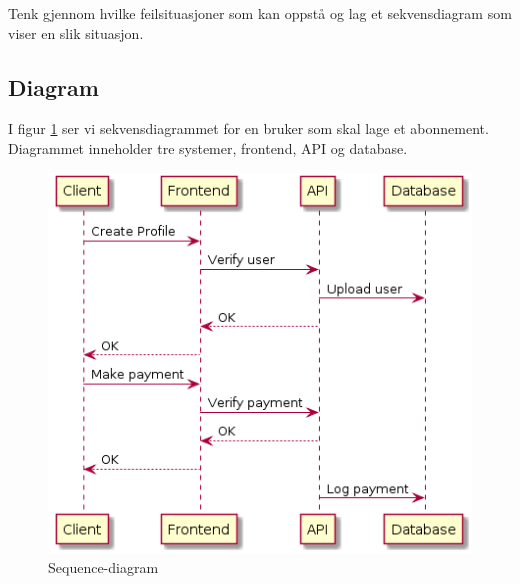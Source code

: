 \documentclass{article}
\begin{document}
Tenk gjennom hvilke feilsituasjoner som kan oppstå og lag et sekvensdiagram som viser en slik situasjon.

\subsection{Diagram}
I figur \ref{fig:oppgave3} ser vi sekvensdiagrammet for en bruker som skal lage et abonnement. Diagrammet inneholder tre systemer, frontend, API og database.
\begin{figure}[h]
\centering
\includegraphics[scale=0.5]{images/oppgave3.png}
\caption{Sequence-diagram}
\label{fig:oppgave3}
\end{figure}
\end{document}

